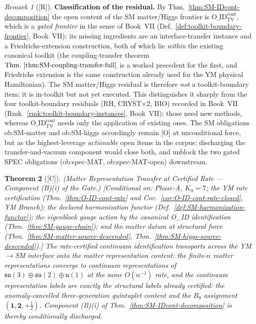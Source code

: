 \documentclass[12pt,oneside]{amsbook}
\theoremstyle{plain}
\newtheorem{theorem}{Theorem}[section]
\theoremstyle{definition}
\theoremstyle{remark}
\newtheorem{remark}[theorem]{Remark}
\newcommand{\status}[1]{\textup{[#1]}}
\begin{document}
\begin{remark}[\status{R}]\label{rem:SM-IDcont-residual-class}
\textbf{Classification of the residual.}
By Thm.~\ref{thm:SM-IDcont-decomposition} the open content of the
SM matter/Higgs frontier is
$\mathrm{O\_ID}^{\mathrm{cont}}_{\mathrm{TV}}$, which is a
\emph{gated frontier} in the sense of Book~VII
(Def.~\ref{def:toolkit-boundary-frontier}, Book~VII): its missing
ingredients are an interface-transfer instance and a
Friedrichs-extension construction, both of which lie \emph{within}
the existing canonical toolkit (the coupling-transfer theorem
$\mathrm{Thm.~\ref{thm:SM-coupling-transfer-full}}$ is a worked
precedent for the first, and Friedrichs extension is the same
construction already used for the YM physical Hamiltonian).  The
SM matter/Higgs residual is therefore \emph{not} a toolkit-boundary
item: it is in-toolkit but not yet executed.  This distinguishes it
sharply from the four toolkit-boundary residuals (RH, CRYST$\times2$,
BIO) recorded in Book~VII
(Rmk.~\ref{rmk:toolkit-boundary-instances}, Book~VII): those need
new methods, whereas
$\mathrm{O\_ID}^{\mathrm{cont}}_{\mathrm{TV}}$ needs only the
application of existing ones.  The SM obligations ob:SM-matter and
ob:SM-higgs accordingly remain [O] at unconditional force, but as
the highest-leverage \emph{actionable} open items in the corpus:
discharging the transfer-and-vacuum component would close both, and
unblock the two gated SPEC obligations (ob:spec-MAT,
ob:spec-MAT-open) downstream.
\end{remark}

\begin{theorem}[\status{C}]\label{thm:SM-IDcont-transfer}
\textup{(Matter Representation Transfer at Certified Rate ---
Component (B)(i) of the Gate.)}
\textup{[Conditional on: Phase-A, $K_0=7$; the YM rate
certification (Thm.~\ref{thm:O-ID-cont-rate} and
Cor.~\ref{cor:O-ID-cont-rate-closed}, YM Branch); the declared
harmonization functor (Def.~\ref{def:SM-harmonization-functor});
the eigenblock gauge action by the canonical O\_ID identification
(Thm.~\ref{thm:SM-gauge-chain}); and the matter datum at
structural force (Thm.~\ref{thm:SM-matter-source-descended},
Thm.~\ref{thm:SM-higgs-source-descended}).]}
The rate-certified continuum identification transports across the
YM$\to$SM interface onto the matter representation content: the
finite-$n$ matter representations converge to continuum
representations of $\mathfrak{su}(3)\oplus\mathfrak{su}(2)\oplus
\mathfrak{u}(1)$ at the same $O(n^{-1})$ rate, and the continuum
representation labels are \emph{exactly} the structural labels
already certified: the anomaly-cancelled three-generation
quintuplet content and the $B_0$ assignment
$(\mathbf{1},\mathbf{2},+\tfrac12)$.  Component (B)(i) of
Thm.~\ref{thm:SM-IDcont-decomposition} is thereby conditionally
discharged.
\end{theorem}
\end{document}
